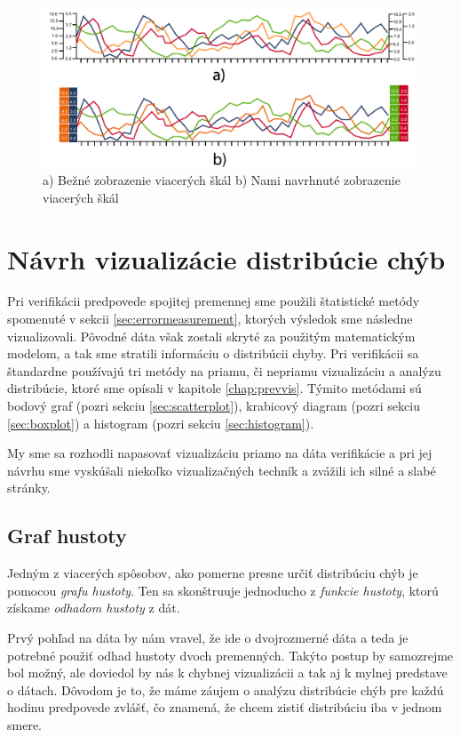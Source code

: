 \begin{figure}
	\centering
	\includegraphics[width = 5in]{multilinegraph}
	\caption{a) Bežné zobrazenie viacerých škál b) Nami navrhnuté zobrazenie viacerých škál }
	\label{fig:multilinegraph} 
\end{figure}

\section{Návrh vizualizácie distribúcie chýb}
\label{sec:distribdesign}
Pri verifikácii predpovede spojitej premennej sme použili štatistické metódy spomenuté v sekcii \ref{sec:errormeasurement}, ktorých výsledok sme následne vizualizovali. Pôvodné dáta však zostali skryté za použitým matematickým modelom, a tak sme stratili informáciu o distribúcii chyby. Pri verifikácii sa štandardne používajú tri metódy na priamu, či nepriamu vizualizáciu a analýzu distribúcie, ktoré sme opísali v kapitole \ref{chap:prevvis}. Týmito metódami sú bodový graf (pozri sekciu \ref{sec:scatterplot}), krabicový diagram (pozri sekciu \ref{sec:boxplot}) a histogram (pozri sekciu \ref{sec:histogram}).

My sme sa rozhodli napasovať vizualizáciu priamo na dáta verifikácie a pri jej návrhu sme vyskúšali niekoľko vizualizačných techník a zvážili ich silné a slabé stránky. 

\subsection{Graf hustoty} %

Jedným z viacerých spôsobov, ako pomerne presne určiť distribúciu chýb je pomocou \textit{grafu hustoty}. Ten sa skonštruuje jednoducho z \textit{funkcie hustoty}, ktorú získame \textit{odhadom hustoty} z dát. 

Prvý pohľad na dáta by nám vravel, že ide o dvojrozmerné dáta a teda je potrebné použiť odhad hustoty dvoch premenných. Takýto postup by samozrejme bol možný, ale doviedol by nás k chybnej vizualizácii a tak aj k mylnej predstave o dátach. Dôvodom je to, že máme záujem o analýzu distribúcie chýb pre každú hodinu predpovede zvlášť, čo znamená, že chcem zistiť distribúciu iba v jednom smere.

